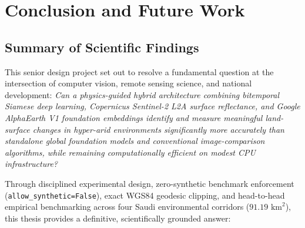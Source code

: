 \chapter{Conclusion and Future Work}
\label{ch:conclusion}

\section{Summary of Scientific Findings}
\label{sec:concl_summary}
This senior design project set out to resolve a fundamental question at the intersection of computer vision, remote sensing science, and national development: \textit{Can a physics-guided hybrid architecture combining bitemporal Siamese deep learning, Copernicus Sentinel-2 L2A surface reflectance, and Google AlphaEarth V1 foundation embeddings identify and measure meaningful land-surface changes in hyper-arid environments significantly more accurately than standalone global foundation models and conventional image-comparison algorithms, while remaining computationally efficient on modest CPU infrastructure?}

Through disciplined experimental design, zero-synthetic benchmark enforcement (\texttt{allow\_synthetic=False}), exact WGS84 geodesic clipping, and head-to-head empirical benchmarking across four Saudi environmental corridors ($91.19\text{ km}^2$), this thesis provides a definitive, scientifically grounded answer:

